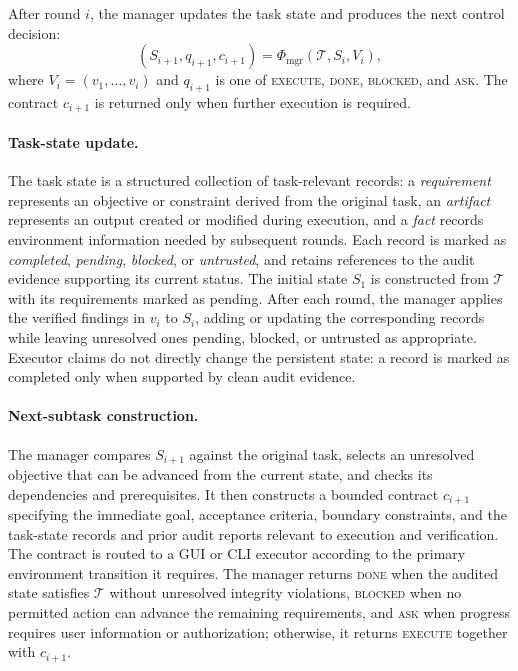 After round $i$, the manager updates the task state and produces the
next control decision:
\begin{equation}
\label{eq:manager}
(S_{i+1},q_{i+1},c_{i+1})
=
\Phi_{\mathrm{mgr}}
\left(
\mathcal{T},
S_i,
V_i
\right),
\end{equation}
where $V_i=(v_1,\ldots,v_i)$ and $q_{i+1}$ is one of
\textsc{execute}, \textsc{done}, \textsc{blocked}, and \textsc{ask}.
The contract $c_{i+1}$ is returned only when further execution is
required.

\paragraph{Task-state update.}
The task state is a structured collection of task-relevant records:
a \textit{requirement} represents an objective or constraint derived
from the original task, an \textit{artifact} represents an output
created or modified during execution, and a \textit{fact} records
environment information needed by subsequent rounds. Each record is
marked as \textit{completed}, \textit{pending}, \textit{blocked}, or
\textit{untrusted}, and retains references to the audit evidence
supporting its current status. The initial state $S_1$ is constructed
from $\mathcal{T}$ with its requirements marked as pending. After each
round, the manager applies the verified findings in $v_i$ to $S_i$,
adding or updating the corresponding records while leaving unresolved
ones pending, blocked, or untrusted as appropriate. Executor claims do
not directly change the persistent state: a record is marked as
completed only when supported by clean audit evidence. 

\paragraph{Next-subtask construction.}
The manager compares $S_{i+1}$ against the original task, selects an
unresolved objective that can be advanced from the current state, and
checks its dependencies and prerequisites. It then constructs a bounded
contract $c_{i+1}$ specifying the immediate goal, acceptance criteria,
boundary constraints, and the task-state records and prior audit reports
relevant to execution and verification. The contract is routed to a GUI
or CLI executor according to the primary environment transition it
requires. The manager returns \textsc{done} when the audited state
satisfies $\mathcal{T}$ without unresolved integrity violations,
\textsc{blocked} when no permitted action can advance the remaining
requirements, and \textsc{ask} when progress requires user information
or authorization; otherwise, it returns \textsc{execute} together with
$c_{i+1}$.


